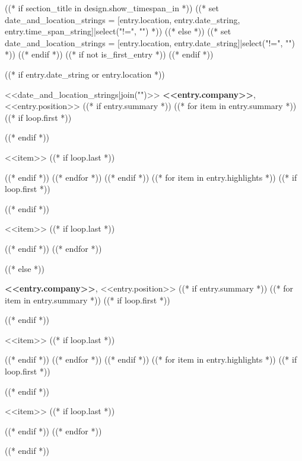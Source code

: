 ((* if section_title in design.show_timespan_in *))
    ((* set date_and_location_strings = [entry.location, entry.date_string, entry.time_span_string]|select("!=", "") *))
((* else *))
    ((* set date_and_location_strings = [entry.location, entry.date_string]|select("!=", "") *))
((* endif *))
((* if not is_first_entry *))
\vspace{<<design.margins.entry_area.vertical_between>>}
((* endif *))

((* if entry.date_string or entry.location *))
\begin{twocolentry}{
    <<date_and_location_strings|join("\n\n")>>
}
    \textbf{<<entry.company>>}, <<entry.position>>
    ((* if entry.summary *))
    ((* for item in entry.summary *))
    ((* if loop.first *))
    \begin{summary}
        ((* endif *))
        \item <<item>>
        ((* if loop.last *))
    \end{summary}
        ((* endif *))
    ((* endfor *))
    ((* endif *))
    ((* for item in entry.highlights *))
        ((* if loop.first *))
    \begin{highlights}
        ((* endif *))
        \item <<item>>
        ((* if loop.last *))
    \end{highlights}
        ((* endif *))
    ((* endfor *))
\end{twocolentry}
((* else *))
\begin{onecolentry}
    \textbf{<<entry.company>>}, <<entry.position>>
    ((* if entry.summary *))
    ((* for item in entry.summary *))
    ((* if loop.first *))
    \begin{summary}
        ((* endif *))
        \item <<item>>
        ((* if loop.last *))
    \end{summary}
        ((* endif *))
    ((* endfor *))
    ((* endif *))
    ((* for item in entry.highlights *))
        ((* if loop.first *))
    \begin{highlights}
        ((* endif *))
        \item <<item>>
        ((* if loop.last *))
    \end{highlights}
        ((* endif *))
    ((* endfor *))
\end{onecolentry}
((* endif *))